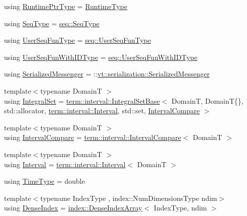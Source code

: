 \begin{DoxyCompactItemize}
\item 
using \hyperlink{namespacevt_a0ce60e0299d8fa32223b3b9ffa0af466}{Runtime\+Ptr\+Type} = \hyperlink{namespacevt_a5c1db2c048b259a2ba8961766ddb9278}{Runtime\+Type}
\item 
using \hyperlink{namespacevt_a98ecd5e376bd317a21b245064361240e}{Seq\+Type} = \hyperlink{namespacevt_1_1seq_a3b612da217ac669d39c159f134ab8434}{seq\+::\+Seq\+Type}
\item 
using \hyperlink{namespacevt_affe11140b7cc6953030f1f158b40750c}{User\+Seq\+Fun\+Type} = \hyperlink{namespacevt_1_1seq_aeb4674d25dcb5d27248b68ec83fad2b6}{seq\+::\+User\+Seq\+Fun\+Type}
\item 
using \hyperlink{namespacevt_a3170103960b4d8f8a0f722750bc0dcc9}{User\+Seq\+Fun\+With\+I\+D\+Type} = \hyperlink{namespacevt_1_1seq_a1a58d0ebe1d6bbed8438607a9c717779}{seq\+::\+User\+Seq\+Fun\+With\+I\+D\+Type}
\item 
using \hyperlink{namespacevt_a490b7af99bdeb06e988d94a7ab389b43}{Serialized\+Messenger} = \+::\hyperlink{structvt_1_1serialization_1_1_serialized_messenger}{vt\+::serialization\+::\+Serialized\+Messenger}
\item 
{\footnotesize template$<$typename DomainT $>$ }\\using \hyperlink{namespacevt_af8fc7210a3d8e598330cf3375857ef1e}{Integral\+Set} = \hyperlink{structvt_1_1term_1_1interval_1_1_integral_set_base}{term\+::interval\+::\+Integral\+Set\+Base}$<$ DomainT, DomainT\{\}, std\+::allocator, \hyperlink{structvt_1_1term_1_1interval_1_1_interval}{term\+::interval\+::\+Interval}, std\+::set, \hyperlink{namespacevt_ab51b754f1d22841f555246195fab9d41}{Interval\+Compare} $>$
\item 
{\footnotesize template$<$typename DomainT $>$ }\\using \hyperlink{namespacevt_ab51b754f1d22841f555246195fab9d41}{Interval\+Compare} = \hyperlink{structvt_1_1term_1_1interval_1_1_interval_compare}{term\+::interval\+::\+Interval\+Compare}$<$ DomainT $>$
\item 
{\footnotesize template$<$typename DomainT $>$ }\\using \hyperlink{namespacevt_a0036b5cb523aef3477d6d5de9d94eabb}{Interval} = \hyperlink{structvt_1_1term_1_1interval_1_1_interval}{term\+::interval\+::\+Interval}$<$ DomainT $>$
\item 
using \hyperlink{namespacevt_a876a9d0cd5a952859c72de8a46881442}{Time\+Type} = double
\item 
{\footnotesize template$<$typename Index\+Type , index\+::\+Num\+Dimensions\+Type ndim$>$ }\\using \hyperlink{namespacevt_ac016d9c31465ce11c14eab2be11f9183}{Dense\+Index} = \hyperlink{structvt_1_1index_1_1_dense_index_array}{index\+::\+Dense\+Index\+Array}$<$ Index\+Type, ndim $>$

\end{DoxyCompactItemize}
